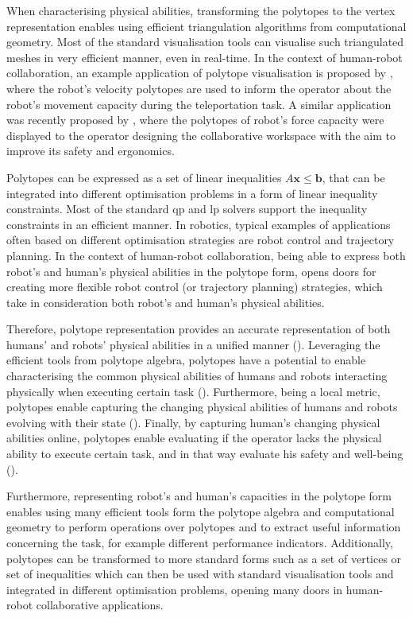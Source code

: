 When characterising physical abilities, transforming the polytopes to the vertex representation enables using efficient triangulation algorithms from computational geometry. Most of the standard visualisation tools can visualise such triangulated meshes in very efficient manner, even in real-time. 
In the context of human-robot collaboration, an example application of polytope visualisation is proposed by \citet{Zolotas2021}, where the  robot's velocity polytopes are used to inform the operator about the robot's movement capacity during the teleportation task. A similar application was recently proposed by \citet{Weistroffer2022Using}, where the polytopes  of robot's force capacity were displayed to the operator designing the collaborative workspace with the aim to improve its safety and ergonomics. 

Polytopes can be expressed as a set of linear inequalities $A\bm{x}\leq\bm{b}$, that can be integrated into different optimisation problems in a form of linear inequality constraints. Most of the standard \gls{qp} \cite{boggs_tolle_1995} and \gls{lp} \cite{GOLDFARB198973} solvers support the inequality constraints in an efficient manner. In robotics, typical examples of applications often based on different optimisation strategies are robot control and trajectory planning. In the context of human-robot collaboration, being able to express both robot's and human's physical abilities in the polytope form, opens doors for creating more flexible robot control (or trajectory planning) strategies, which take in consideration both robot's and human's physical abilities.

Therefore, polytope representation provides an accurate representation of both humans' and robots' physical abilities in a unified manner (). Leveraging the efficient tools from polytope algebra, polytopes have a potential to enable characterising the common physical abilities of humans and robots interacting physically when executing certain task (). Furthermore, being a local metric, polytopes enable capturing the changing physical abilities of humans and robots evolving with their state (). Finally, by capturing human's changing physical abilities online, polytopes enable evaluating if the operator lacks the physical ability to execute certain task, and in that way evaluate his safety and well-being (). 

Furthermore, representing robot's and human's capacities in the polytope form enables using many efficient tools form the polytope algebra and computational geometry to perform operations over polytopes and to extract useful information concerning the task, for example different performance indicators. Additionally, polytopes can be transformed to more standard forms such as a set of vertices or set of inequalities which can then be used with standard visualisation tools and integrated in different optimisation problems, opening many doors in human-robot collaborative applications.


